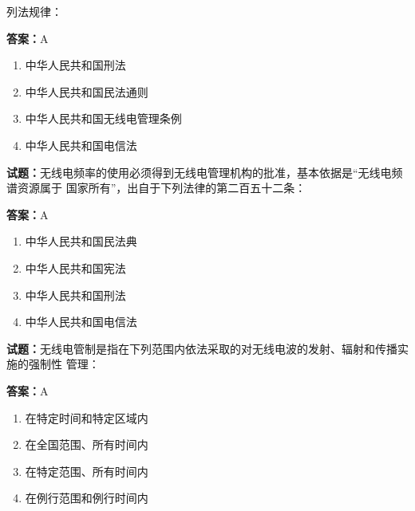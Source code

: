 \documentclass{ctexbook}
\begin{document}
列法规律： 

\textbf{答案：}A 

\begin{enumerate}[leftmargin=3em]
  \item 中华人民共和国刑法 

  \item 中华人民共和国民法通则 

  \item 中华人民共和国无线电管理条例 

  \item 中华人民共和国电信法 

\end{enumerate}





\vspace{1em}

\textbf{试题：}无线电频率的使用必须得到无线电管理机构的批准，基本依据是“无线电频谱资源属于
国家所有”，出自于下列法律的第二百五十二条： 

\textbf{答案：}A 

\begin{enumerate}[leftmargin=3em]
  \item 中华人民共和国民法典 

  \item 中华人民共和国宪法 

  \item 中华人民共和国刑法 

  \item 中华人民共和国电信法 

\end{enumerate}





\vspace{1em}

\textbf{试题：}无线电管制是指在下列范围内依法采取的对无线电波的发射、辐射和传播实施的强制性
管理： 

\textbf{答案：}A 

\begin{enumerate}[leftmargin=3em]
  \item 在特定时间和特定区域内 

  \item 在全国范围、所有时间内 

  \item 在特定范围、所有时间内 

  \item 在例行范围和例行时间内 

\end{enumerate}
\end{document}
